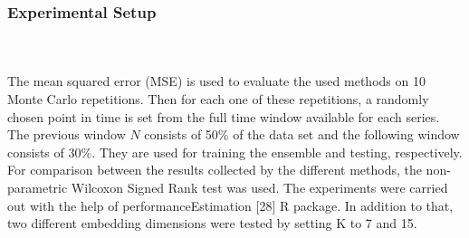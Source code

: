 \documentclass[runningheads,a4paper]{llncs}[2015/06/24]
\begin{document}
\subsubsection{Experimental Setup}
\hspace{1cm}\\\\ The mean squared error (MSE) is used to evaluate the used methods on 10 Monte Carlo repetitions. Then for each one of these repetitions, a randomly chosen point in time is set from the full time window available for each series. The previous window $N$ consists of 50\% of the data set and the following window consists of 30\%. They are used for training the ensemble and testing, respectively. For comparison between the results collected by the different methods, the non-parametric Wilcoxon Signed Rank test was used. The experiments were carried out with the help of performanceEstimation [28] R package. In addition to that, two different embedding dimensions were tested by setting K to 7 and 15. 
\end{document}
